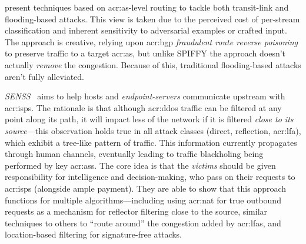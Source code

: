 \Textcite{DBLP:conf/sp/SmithS18} present techniques based on \gls{acr:as}-level routing to tackle both transit-link and flooding-based attacks.
This view is taken due to the perceived cost of per-stream classification and inherent sensitivity to adversarial examples or crafted input.
The approach is creative, relying upon \gls{acr:bgp} \emph{fraudulent route reverse poisoning} to preserve traffic to a target \gls{acr:as}, but unlike SPIFFY the approach doesn't actually \emph{remove} the congestion.
Because of this, traditional flooding-based attacks aren't fully alleviated.

\emph{SENSS}~\parencite{DBLP:conf/acsac/RamanathanMYZ18} aims to help hosts and \emph{endpoint-servers} communicate upstream with \glspl{acr:isp}.
The rationale is that although \gls{acr:ddos} traffic can be filtered at any point along its path, it will impact less of the network if it is filtered \emph{close to its source}---this observation holds true in all attack classes (direct, reflection, \gls{acr:lfa}), which exhibit a tree-like pattern of traffic.
This information currently propagates through human channels, eventually leading to traffic blackholing being performed by key \glspl{acr:as}.
The core idea is that the \emph{victims} should be given responsibility for intelligence and decision-making, who pass on their requests to \glspl{acr:isp} (alongside ample payment).
They are able to show that this approach functions for multiple algorithms---including using \gls{acr:nat} for true outbound requests as a mechanism for reflector filtering close to the source, similar techniques to others to ``route around'' the congestion added by \glspl{acr:lfa}, and location-based filtering for signature-free attacks.

